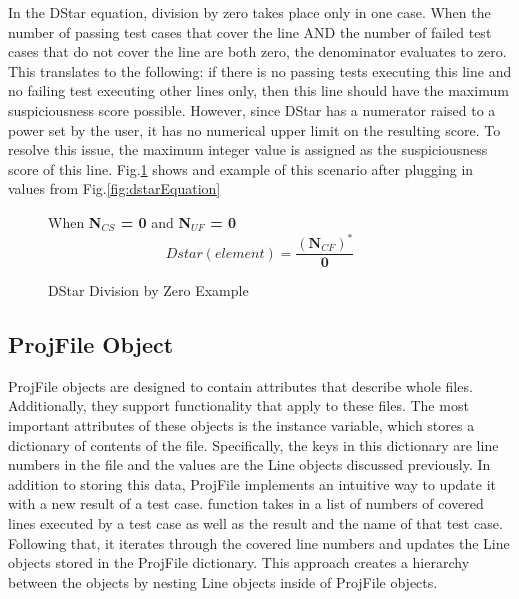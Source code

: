 In the DStar equation, division by zero takes place only in one case. When the
number of passing test cases that cover the line AND the number of failed test
cases that do not cover the line are both zero, the denominator evaluates to
zero. This translates to the following: if there is no passing tests executing
this line and no failing test executing other lines only, then this line should
have the maximum suspiciousness score possible. However, since DStar has a
numerator raised to a power set by the user, it has no numerical upper limit on
the resulting score. To resolve this issue, the maximum integer value is
assigned as the suspiciousness score of this line.
Fig.\ref{fig:dstar_div_by_zero} shows and example of this scenario after
plugging in values from Fig.\ref{fig:dstarEquation}

\begin{figure}[!htb]
	\begin{center}
        When \textbf{N$_{CS}$ = 0} and \textbf{N$_{UF}$ = 0 }
		\begin{equation}
			Dstar(element) = \frac{(\textbf{N$_{CF}$})^{\ast}}{\textbf{0}}
		\end{equation}
		\caption{\label{fig:dstar_div_by_zero} DStar Division by Zero Example}
	\end{center}
\end{figure}

\subsection{ProjFile Object}
\label{subsec:projfile_obj}

ProjFile objects are designed to contain attributes that describe whole files.
Additionally, they support functionality that apply to these files. The most
important attributes of these objects is the  instance variable,
which stores a dictionary of contents of the file. Specifically, the keys in
this dictionary are line numbers in the file and the values are the Line objects
discussed previously. In addition to storing this data, ProjFile implements an
intuitive way to update it with a new result of a test case. 
function takes in a list of numbers of covered lines executed by a test case as well as the
result and the name of that test case. Following that, it iterates through the
covered line numbers and updates the Line objects stored in the ProjFile
dictionary. This approach creates a hierarchy between the objects by nesting
Line objects inside of ProjFile objects.

